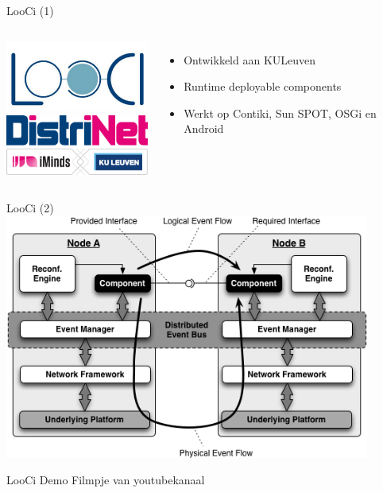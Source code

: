 \documentclass[presentation, bigger]{beamer}
\begin{document}
\begin{frame}[label=sec-2-3]{LooCi (1)}
\begin{columns}[t]
\centering
\includegraphics[width=5cm,keepaspectration=true]{looci/looci.png}\\
\includegraphics[width=5cm,keepaspectration=true]{looci/distrinet.png}
\centering
\begin{itemize}
\item Ontwikkeld aan KULeuven
\item Runtime deployable components
\item Werkt op Contiki, Sun SPOT, OSGi en Android
\end{itemize}
\end{columns}
\end{frame}

\begin{frame}[label=sec-2-4]{LooCi (2)}
\centering
\includegraphics[width=0.9\textwidth,keepaspectration=true]{looci/LooCIExecEnvironment.png}
\end{frame}

\begin{frame}[label=sec-2-5]{LooCi Demo}
Filmpje van youtubekanaal
\end{frame}
\end{document}
